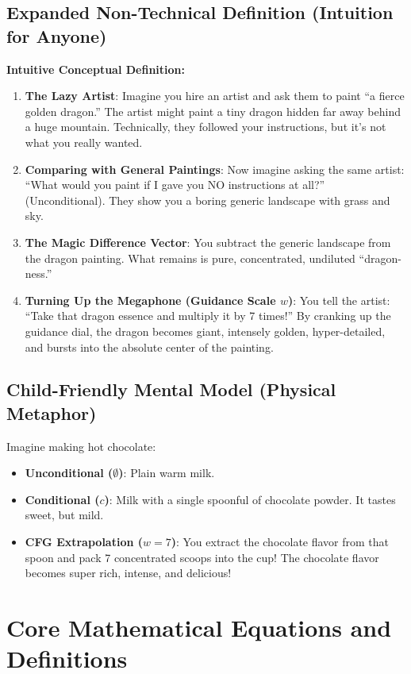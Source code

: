 \documentclass[11pt,a4paper]{article}
\theoremstyle{definition}
\begin{document}
\subsection{Expanded Non-Technical Definition (Intuition for Anyone)}
\textbf{Intuitive Conceptual Definition:}
\begin{enumerate}
    \item \textbf{The Lazy Artist}: Imagine you hire an artist and ask them to paint ``a fierce golden dragon.'' The artist might paint a tiny dragon hidden far away behind a huge mountain. Technically, they followed your instructions, but it's not what you really wanted.
    \item \textbf{Comparing with General Paintings}: Now imagine asking the same artist: ``What would you paint if I gave you NO instructions at all?'' (Unconditional). They show you a boring generic landscape with grass and sky.
    \item \textbf{The Magic Difference Vector}: You subtract the generic landscape from the dragon painting. What remains is pure, concentrated, undiluted ``dragon-ness.''
    \item \textbf{Turning Up the Megaphone (Guidance Scale $w$)}: You tell the artist: ``Take that dragon essence and multiply it by 7 times!'' By cranking up the guidance dial, the dragon becomes giant, intensely golden, hyper-detailed, and bursts into the absolute center of the painting.
\end{enumerate}

\subsection{Child-Friendly Mental Model (Physical Metaphor)}
Imagine making hot chocolate:
\begin{itemize}
    \item \textbf{Unconditional ($\emptyset$)}: Plain warm milk.
    \item \textbf{Conditional ($c$)}: Milk with a single spoonful of chocolate powder. It tastes sweet, but mild.
    \item \textbf{CFG Extrapolation ($w = 7$)}: You extract the chocolate flavor from that spoon and pack 7 concentrated scoops into the cup! The chocolate flavor becomes super rich, intense, and delicious!
\end{itemize}

\section{Core Mathematical Equations and Definitions}
\end{document}

